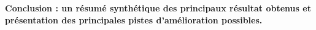 
\textbf{Conclusion : un résumé synthétique des principaux résultat obtenus et présentation des principales pistes d'amélioration possibles.} \\

